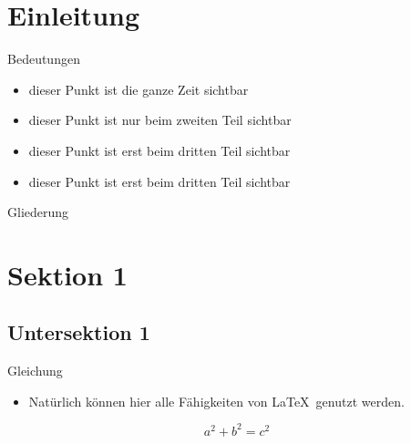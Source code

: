 

\begin{frame}
	\titlepage
\end{frame}


\section{Einleitung}


\begin{frame}{Bedeutungen}
	\begin{itemize}
		\item<1-> dieser Punkt ist die ganze Zeit sichtbar
		\item<2> dieser Punkt ist nur beim zweiten Teil sichtbar
		\item<3> dieser Punkt ist erst beim dritten Teil sichtbar
		\item<3> dieser Punkt ist erst beim dritten Teil sichtbar
		\end{itemize}
\end{frame}


\begin{frame}{Gliederung}
	\tableofcontents[sections={<2->},firstsection=2]
\end{frame}

\section{Sektion 1}
\subsection{Untersektion 1}
\begin{frame}{Gleichung}
	\begin{itemize}
		\item Natürlich können hier alle Fähigkeiten von \LaTeX\, genutzt werden.
	\end{itemize}
	\begin{equation}
		a^2 + b^2 = c^2
	\end{equation}
\end{frame}


